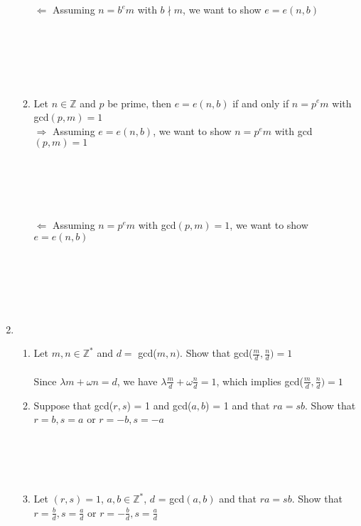 \documentclass[11pt]{article}
\begin{document}
\begin{enumerate}
\begin{enumerate}
$\Leftarrow$ Assuming $n = b^em$ with $b \nmid m$, we want to show $e = e(n,b)$\\
\\
\\
\\
\\
\\

\item Let $n \in \mathbb{Z}$ and $p$ be prime, then $e = e(n,b)$ if and only if $n = p^em$ with gcd$(p,m) = 1$\\
$\Rightarrow$ Assuming $e = e(n,b)$, we want to show $n = p^em$ with gcd$(p,m) = 1$\\
\\
\\
\\
\\
\\

$\Leftarrow$ Assuming $n = p^em$ with gcd$(p,m) = 1$, we want to show $e = e(n,b)$\\
\\
\\
\\
\\
\\

\end{enumerate}


\newpage %
\item 
\begin{enumerate}
\item Let $m,n \in \mathbb{Z}^*$ and $d = $ gcd($m,n)$.  Show that gcd($\tfrac{m}{d} , \tfrac{n}{d}) = 1$
\\\\
Since $\lambda m + \omega n = d$, we have $\lambda \tfrac{m}{d} + \omega \tfrac{n}{d} = 1$, which implies gcd($\tfrac{m}{d} , \tfrac{n}{d}) = 1$
\\
\item Suppose that gcd($r,s$) = 1 and gcd($a,b$) = 1 and that $ra = sb$.  Show that $r=b, s = a$ or $r = -b, s = -a$
\\
\\
\\
\\
\\

\item Let $(r,s) = 1$, $a,b \in \mathbb{Z}^*$, $d$ = gcd$(a,b)$ and that $ra = sb$.  Show that $r = \tfrac{b}{d}, s = \tfrac{a}{d}$ or $r = -\tfrac{b}{d}, s=\tfrac{a}{d}$
\\
\\
\\
\\
\\


\end{enumerate}
\end{enumerate}
\end{document}
